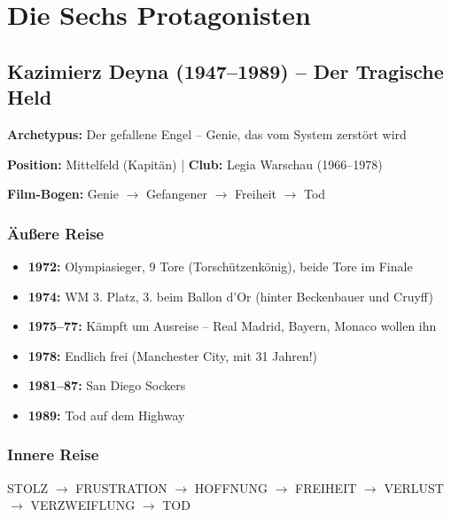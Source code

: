 \documentclass[11pt,a4paper]{book}
\newenvironment{filminfo}{%
  \begin{mdframed}[
    linecolor=darkgray,
    linewidth=1pt,
    backgroundcolor=gray!5,
    innertopmargin=10pt,
    innerbottommargin=10pt
  ]
}{%
  \end{mdframed}
}
\begin{document}

\chapter{Die Sechs Protagonisten}

\section{Kazimierz Deyna (1947--1989) -- Der Tragische Held}

\begin{filminfo}
\textbf{Archetypus:} Der gefallene Engel -- Genie, das vom System zerstört wird

\textbf{Position:} Mittelfeld (Kapitän) | \textbf{Club:} Legia Warschau (1966--1978)

\textbf{Film-Bogen:} Genie $\rightarrow$ Gefangener $\rightarrow$ Freiheit $\rightarrow$ Tod
\end{filminfo}

\subsection{Äußere Reise}

\begin{itemize}
    \item \textbf{1972:} Olympiasieger, 9 Tore (Torschützenkönig), beide Tore im Finale
    \item \textbf{1974:} WM 3. Platz, 3. beim Ballon d'Or (hinter Beckenbauer und Cruyff)
    \item \textbf{1975--77:} Kämpft um Ausreise -- Real Madrid, Bayern, Monaco wollen ihn
    \item \textbf{1978:} Endlich frei (Manchester City, mit 31 Jahren!)
    \item \textbf{1981--87:} San Diego Sockers
    \item \textbf{1989:} Tod auf dem Highway
\end{itemize}

\subsection{Innere Reise}

STOLZ $\rightarrow$ FRUSTRATION $\rightarrow$ HOFFNUNG $\rightarrow$ FREIHEIT $\rightarrow$ VERLUST $\rightarrow$ VERZWEIFLUNG $\rightarrow$ TOD
\end{document}
